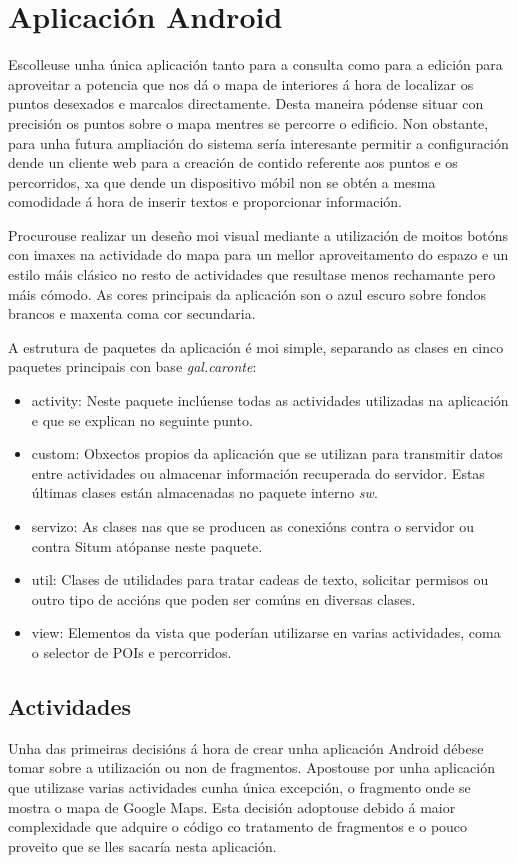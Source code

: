 \section{Aplicación Android}
Escolleuse unha única aplicación tanto para a consulta como para a edición para aproveitar a potencia que nos dá o mapa de interiores á hora de localizar os puntos desexados e marcalos directamente. Desta maneira pódense situar con precisión os puntos sobre o mapa mentres se percorre o edificio. Non obstante, para unha futura ampliación do sistema sería interesante permitir a configuración dende un cliente web para a creación de contido referente aos puntos e os percorridos, xa que dende un dispositivo móbil non se obtén a mesma comodidade á hora de inserir textos e proporcionar información.

Procurouse realizar un deseño moi visual mediante a utilización de moitos botóns con imaxes na actividade do mapa para un mellor aproveitamento do espazo e un estilo máis clásico no resto de actividades que resultase menos rechamante pero máis cómodo. As cores principais da aplicación son o azul escuro sobre fondos brancos e maxenta coma cor secundaria.

A estrutura de paquetes da aplicación é moi simple, separando as clases en cinco paquetes principais con base \emph{gal.caronte}:

\begin{itemize}
	\item activity: Neste paquete inclúense todas as actividades utilizadas na aplicación e que se explican no seguinte punto.
	\item custom: Obxectos propios da aplicación que se utilizan para transmitir datos entre actividades ou almacenar información recuperada do servidor. Estas últimas clases están almacenadas no paquete interno \emph{sw}.
	\item servizo: As clases nas que se producen as conexións contra o servidor ou contra Situm atópanse neste paquete.
	\item util: Clases de utilidades para tratar cadeas de texto, solicitar permisos ou outro tipo de accións que poden ser comúns en diversas clases.
	\item view: Elementos da vista que poderían utilizarse en varias actividades, coma o selector de POIs e percorridos.
\end{itemize}

\subsection{Actividades}
Unha das primeiras decisións á hora de crear unha aplicación Android débese tomar sobre a utilización ou non de fragmentos. Apostouse por unha aplicación que utilizase varias actividades cunha única excepción, o fragmento onde se mostra o mapa de Google Maps. Esta decisión adoptouse debido á maior complexidade que adquire o código co tratamento de fragmentos e o pouco proveito que se lles sacaría nesta aplicación.

